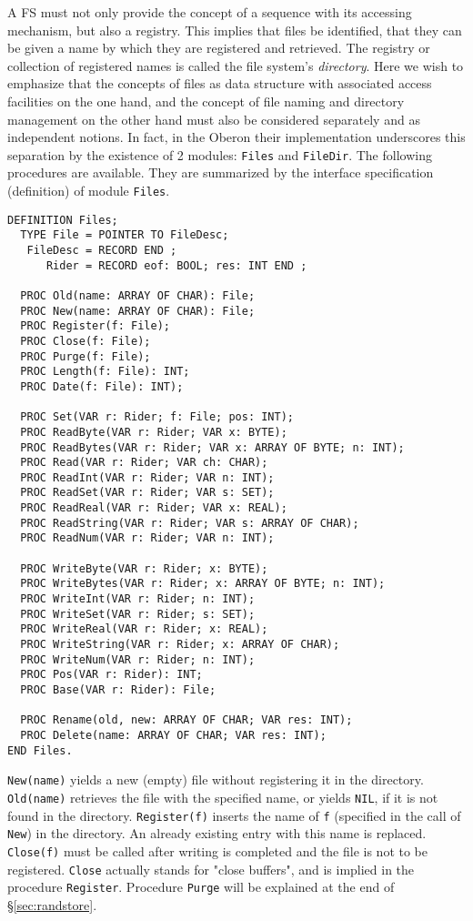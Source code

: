 A FS must not only provide the concept of a sequence with its accessing mechanism, but also a registry.
This implies that files be identified, that they can be given a name by which they are registered and
retrieved. The registry or collection of registered names is called the file system's \emph{directory}.
Here we wish to emphasize that the concepts of files as data structure with associated access facilities
on the one hand, and the concept of file naming and directory management on the other hand must also be
considered separately and as independent notions.  In fact, in the Oberon their implementation
underscores this separation by the existence of 2 modules: \verb|Files| and \verb|FileDir|. The
following procedures are available. They are summarized by the interface specification (definition) of
module \verb|Files|.
\begin{verbatim}
DEFINITION Files;
  TYPE File = POINTER TO FileDesc;
   FileDesc = RECORD END ;
      Rider = RECORD eof: BOOL; res: INT END ;

  PROC Old(name: ARRAY OF CHAR): File;
  PROC New(name: ARRAY OF CHAR): File;
  PROC Register(f: File);
  PROC Close(f: File);
  PROC Purge(f: File);
  PROC Length(f: File): INT;
  PROC Date(f: File): INT);

  PROC Set(VAR r: Rider; f: File; pos: INT);
  PROC ReadByte(VAR r: Rider; VAR x: BYTE);
  PROC ReadBytes(VAR r: Rider; VAR x: ARRAY OF BYTE; n: INT);
  PROC Read(VAR r: Rider; VAR ch: CHAR);
  PROC ReadInt(VAR r: Rider; VAR n: INT);
  PROC ReadSet(VAR r: Rider; VAR s: SET);
  PROC ReadReal(VAR r: Rider; VAR x: REAL);
  PROC ReadString(VAR r: Rider; VAR s: ARRAY OF CHAR);
  PROC ReadNum(VAR r: Rider; VAR n: INT);

  PROC WriteByte(VAR r: Rider; x: BYTE);
  PROC WriteBytes(VAR r: Rider; x: ARRAY OF BYTE; n: INT);
  PROC WriteInt(VAR r: Rider; n: INT);
  PROC WriteSet(VAR r: Rider; s: SET);
  PROC WriteReal(VAR r: Rider; x: REAL);
  PROC WriteString(VAR r: Rider; x: ARRAY OF CHAR);
  PROC WriteNum(VAR r: Rider; n: INT);
  PROC Pos(VAR r: Rider): INT;
  PROC Base(VAR r: Rider): File;

  PROC Rename(old, new: ARRAY OF CHAR; VAR res: INT);
  PROC Delete(name: ARRAY OF CHAR; VAR res: INT);
END Files.
\end{verbatim}

\verb|New(name)| yields a new (empty) file without registering it in the directory. \verb|Old(name)|
retrieves the file with the specified name, or yields \verb|NIL|, if it is not found in the directory.
\verb|Register(f)| inserts the name of \verb|f| (specified in the call of \verb|New|) in the directory.
An already existing entry with this name is replaced. \verb|Close(f)| must be called after writing is
completed and the file is not to be registered. \verb|Close| actually stands for "close buffers", and
is implied in the procedure \verb|Register|.  Procedure \verb|Purge| will be explained at the end of
\S \ref{sec:randstore}.

